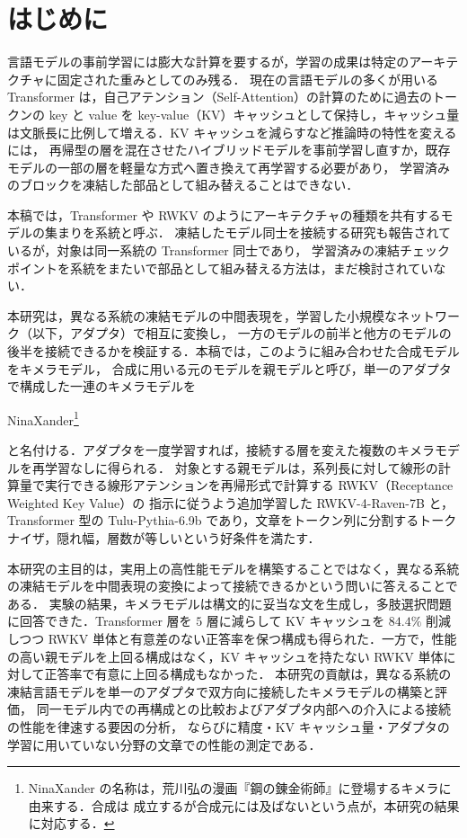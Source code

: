 \documentclass[techrep,noauthor]{ipsj}
\newcommand{\kw}[1]{#1}
\newcommand{\rev}[1]{{\color{blue}#1}}
\newcommand{\revr}[1]{{\color{red}#1}}
\newcommand{\revp}[1]{{\color{violet}#1}}
\begin{document}
\section{はじめに}\label{sec:intro}
\rev{言語モデルの事前学習には膨大な計算を要するが，学習の成果は特定のアーキテクチャに固定された重みとしてのみ残る．
現在の言語モデルの多くが用いる Transformer は，自己アテンション（Self-Attention）の計算のために過去のトークンの key と value を
key-value（KV）キャッシュとして保持し，キャッシュ量は文脈長に比例して増える．KV キャッシュを減らすなど推論時の特性を変えるには，
再帰型の層を混在させたハイブリッドモデルを事前学習し直すか，既存モデルの一部の層を軽量な方式へ置き換えて再学習する必要があり，
学習済みのブロックを凍結した部品として組み替えることはできない．

本稿では，Transformer や RWKV のようにアーキテクチャの種類を共有するモデルの集まりを系統と呼ぶ．
凍結したモデル同士を接続する研究も報告されているが，対象は同一系統の Transformer 同士であり，
学習済みの凍結チェックポイントを系統をまたいで部品として組み替える方法は，まだ検討されていない．

本研究は，異なる系統の凍結モデルの中間表現を，学習した小規模なネットワーク（以下，アダプタ）で相互に変換し，
一方のモデルの前半と他方のモデルの後半を接続できるかを検証する．本稿では，このように組み合わせた合成モデルをキメラモデル，
合成に用いる元のモデルを親モデルと呼び，単一のアダプタで構成した一連のキメラモデルを}
\kw{NinaXander}\footnote{NinaXander の名称は，荒川弘の漫画『鋼の錬金術師』に登場するキメラに由来する．合成は
成立するが合成元には及ばないという点が，本研究の結果に対応する．}\rev{と名付ける．アダプタを一度学習すれば，接続する層を変えた複数の\revr{キメラモデル}を再学習なしに得られる．
対象とする親モデルは，系列長に対して線形の計算量で実行できる線形アテンションを再帰形式で計算する RWKV（Receptance Weighted Key Value）の
指示に従うよう追加学習した RWKV-4-Raven-7B と，Transformer 型の Tulu-Pythia-6.9b であり，文章をトークン列に分割するトークナイザ，\revp{隠れ幅}，層数が等しいという好条件を満たす．

本研究の主目的は，実用上の高性能モデルを構築することではなく，異なる系統の凍結モデルを中間表現の変換によって接続できるかという問いに答えることである．
実験の結果，キメラモデルは構文的に妥当な文を生成し，多肢選択問題に回答できた．Transformer 層を $5$ 層に減らして KV キャッシュを $84.4\%$ 削減しつつ
\revr{RWKV 単体と有意差のない正答率を保つ}構成も得られた．一方で，性能の高い親モデルを上回る構成はなく，KV キャッシュを持たない RWKV 単体に対して正答率で有意に上回る構成もなかった．
本研究の貢献は，異なる系統の凍結言語モデルを単一のアダプタで双方向に接続したキメラモデルの構築と評価，
同一モデル内での再構成との比較およびアダプタ内部への介入による接続の性能を律速する要因の分析，
ならびに精度・KV キャッシュ量・アダプタの学習に用いていない分野の文章での性能の測定である．}
\end{document}
